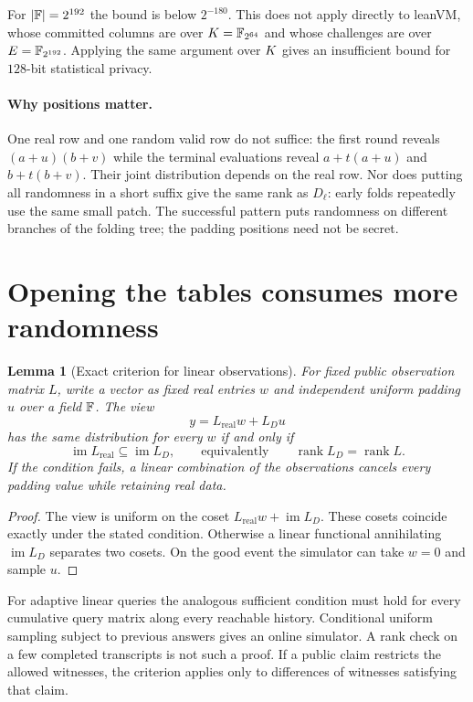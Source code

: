 \documentclass[11pt]{article}
\newtheorem{lemma}[proposition]{Lemma}
\begin{document}
For $|\mathbb{F}|=2^{192}$ the bound is below $2^{-180}$. This does not apply directly to leanVM, whose committed columns are over $K=\mathbb{F}_{2^{64}}$ and whose challenges are over $E=\mathbb{F}_{2^{192}}$. Applying the same argument over $K$ gives an insufficient bound for $128$-bit statistical privacy.

\paragraph{Why positions matter.} One real row and one random valid row do not suffice: the first round reveals $(a+u)(b+v)$ while the terminal evaluations reveal $a+t(a+u)$ and $b+t(b+v)$. Their joint distribution depends on the real row. Nor does putting all randomness in a short suffix give the same rank as $D_\ell$: early folds repeatedly use the same small patch. The successful pattern puts randomness on different branches of the folding tree; the padding positions need not be secret.

\section{Opening the tables consumes more randomness}

\begin{lemma}[Exact criterion for linear observations]\label{lem:linear}
For fixed public observation matrix $L$, write a vector as fixed real entries $w$ and independent uniform padding $u$ over a field $\mathbb{F}$. The view
\[
 y=L_{\mathrm{real}}w+L_Du
\]
has the same distribution for every $w$ if and only if
\[
 \operatorname{im}L_{\mathrm{real}}\subseteq\operatorname{im}L_D,
 \qquad\text{equivalently}\qquad
 \operatorname{rank}L_D=\operatorname{rank}L.
\]
If the condition fails, a linear combination of the observations cancels every padding value while retaining real data.
\end{lemma}

\begin{proof}
The view is uniform on the coset $L_{\mathrm{real}}w+\operatorname{im}L_D$. These cosets coincide exactly under the stated condition. Otherwise a linear functional annihilating $\operatorname{im}L_D$ separates two cosets. On the good event the simulator can take $w=0$ and sample $u$.
\end{proof}

For adaptive linear queries the analogous sufficient condition must hold for every cumulative query matrix along every reachable history. Conditional uniform sampling subject to previous answers gives an online simulator. A rank check on a few completed transcripts is not such a proof. If a public claim restricts the allowed witnesses, the criterion applies only to differences of witnesses satisfying that claim.
\end{document}
